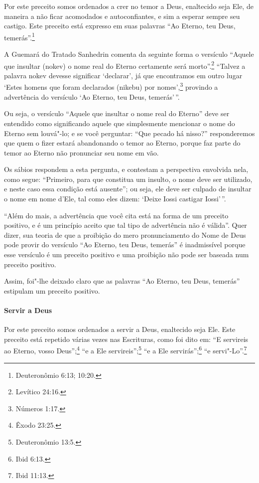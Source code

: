 \begin{multicols}{2}
Por este preceito somos ordenados a crer no temor a Deus, enaltecido
seja Ele, de maneira a não ficar acomodados e autoconfiantes, e sim a
esperar sempre seu castigo. Este preceito está expresso em suas
palavras ``Ao Eterno, teu Deus, temerás''.\footnote{Deuteronômio 6:13; 10:20.}

A Guemará\starr{} do Tratado Sanhedrin\starr{} comenta da seguinte forma o versículo
``Aquele que insultar (nokev\starr) o nome real do Eterno certamente
será morto''.\footnote{Levítico 24:16.} ``Talvez a palavra nokev\starr{} devesse
significar `declarar', já que encontramos em outro lugar `Estes homens
que foram declarados (nikebu\starr) por nomes',\footnote{Números 1:17.} provindo a advertência do versículo `Ao Eterno, teu Deus, temerás'\,''. 

Ou seja, o versículo ``Aquele que insultar o nome real do Eterno'' deve ser
entendido como significando aquele que simplesmente mencionar o nome do
Eterno sem louvá"-lo; e se você perguntar: ``Que pecado há nisso?'' responderemos que quem o fizer estará abandonando o temor
ao Eterno, porque faz parte do temor ao Eterno não pronunciar seu nome
em vão.

Os sábios respondem a esta pergunta, e contestam a perspectiva envolvida
nela, como segue: ``Primeiro, para que constitua um insulto, o nome deve
ser utilizado, e neste caso essa condição está ausente''; ou seja, ele
deve ser culpado de insultar o nome em nome d'Ele, tal como eles dizem:
`Deixe Iossi\starr{} castigar Iossi\starr'\,''.

``Além do mais, a advertência que você cita está na forma de um preceito
positivo, e é um princípio aceito que tal tipo de advertência não é
válida''. Quer dizer, sua teoria de que a proibição do mero
pronunciamento do Nome de Deus pode provir do versículo ``Ao Eterno, teu
Deus, temerás'' é inadmissível porque esse versículo é um preceito
positivo e uma proibição não pode ser baseada num preceito positivo.

Assim, foi"-lhe deixado claro que as palavras ``Ao Eterno, teu Deus,
temerás'' estipulam um preceito positivo.

\paragraph{Servir a Deus}

Por este preceito somos ordenados a servir a Deus, enaltecido seja Ele.
Este preceito está repetido várias vezes nas Escrituras, como foi dito
em: ``E servireis ao Eterno, vosso Deus'';\footnote{Êxodo 23:25.} ``e a Ele
servireis'';\footnote{Deuteronômio 13:5.} ``e a Ele servirás'';\footnote{Ibid 6:13.} ``e servi"-Lo''.\footnote{Ibid 11:13.}


\end{multicols}
